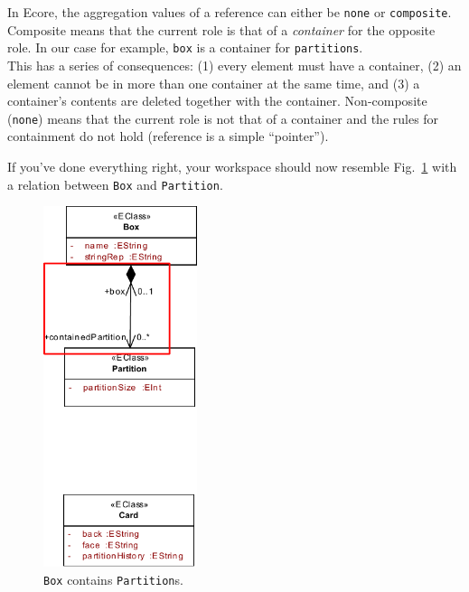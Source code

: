 In Ecore, the aggregation values of a reference can either be \texttt{none} or \texttt{com\-po\-site}.
Composite means that the current role is that of a \emph{container} for the opposite role.
In our case for example, \texttt{box} is a container for \texttt{partitions}.\\
This has a series of consequences: (1) every element must have a container, (2) an element cannot be in more than one container at the same time, and (3) a container's contents are deleted together with the container.
Non-composite (\texttt{none}) means that the current role is not that of a container and the rules for containment do not hold (reference is a simple ``pointer'').

If you've done everything right, your workspace should now resemble Fig.~\ref{fig:ereference_completed} with a relation between \texttt{Box} and \texttt{Partition}.

\begin{figure}[htbp]
	\centering
  \includegraphics[width=0.4\textwidth]{pics/memBoxBilder/memBox28.pdf}
	\caption{\texttt{Box} contains \texttt{Partition}s.}
	\label{fig:ereference_completed}
\end{figure}

